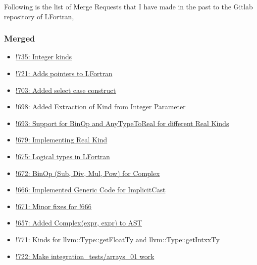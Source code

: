 Following is the list of Merge Requests that I have made in the past to the Gitlab repository of LFortran,

\subsubsection{Merged}

\begin{itemize}

    \item \href{https://gitlab.com/lfortran/lfortran/-/merge_requests/755}{!735: Integer kinds}
    
    \item \href{https://gitlab.com/lfortran/lfortran/-/merge_requests/721}{!721: Adds pointers to LFortran}
    
    \item \href{https://gitlab.com/lfortran/lfortran/-/merge_requests/703}{!703: Added select case construct}
    
    \item \href{https://gitlab.com/lfortran/lfortran/-/merge_requests/698}{!698: Added Extraction of Kind from Integer Parameter}
    
    \item \href{https://gitlab.com/lfortran/lfortran/-/merge_requests/693}{!693: Support for BinOp and AnyTypeToReal for different Real Kinds}
    
    \item \href{https://gitlab.com/lfortran/lfortran/-/merge_requests/679}{!679: Implementing Real Kind}
    
    \item \href{https://gitlab.com/lfortran/lfortran/-/merge_requests/675}{!675: Logical types in LFortran}
    
    \item \href{https://gitlab.com/lfortran/lfortran/-/merge_requests/672}{!672: BinOp (Sub, Div, Mul, Pow) for Complex}
    
    \item \href{https://gitlab.com/lfortran/lfortran/-/merge_requests/666}{!666: Implemented Generic Code for ImplicitCast}
    
    \item \href{https://gitlab.com/lfortran/lfortran/-/merge_requests/671}{!671: Minor fixes for !666}
    
    \item \href{https://gitlab.com/lfortran/lfortran/-/merge_requests/657}{!657: Added Complex(expr, expr) to AST}
    
    \item \href{https://gitlab.com/lfortran/lfortran/-/merge_requests/771}{!771: Kinds for llvm::Type::getFloatTy and llvm::Type::getIntxxTy}
    
    \item \href{https://gitlab.com/lfortran/lfortran/-/merge_requests/722}{!722: Make integration\_tests/arrays\_01 work}

\end{itemize}

